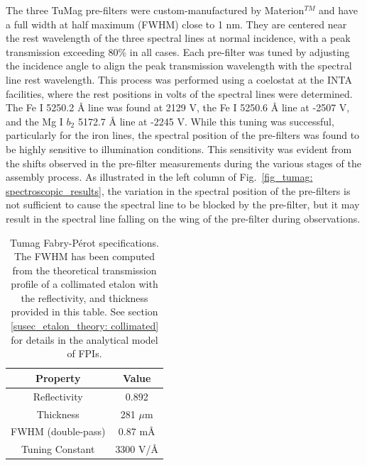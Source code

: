 The three TuMag pre-filters were custom-manufactured by Materion$^{TM}$ and have a full width at half maximum (FWHM) close to 1 nm. They are centered near the rest wavelength of the three spectral lines at normal incidence, with a peak transmission exceeding 80\% in all cases. Each pre-filter was tuned by adjusting the incidence angle to align the peak transmission wavelength with the spectral line rest wavelength. This process was performed using a coelostat at the INTA facilities, where the rest positions in volts of the spectral lines were determined. The Fe I 5250.2 \r{A} line was found at 2129 V, the Fe I 5250.6 \r{A} line at -2507 V, and the Mg I $b_2$ 5172.7 \r{A} line at -2245 V. While this tuning was successful, particularly for the iron lines, the spectral position of the pre-filters was found to be highly sensitive to illumination conditions. This sensitivity was evident from the shifts observed in the pre-filter measurements during the various stages of the assembly process. As illustrated in the left column of Fig.~\ref{fig_tumag: spectroscopic_results}, the variation in the spectral position of the pre-filters is not sufficient to cause the spectral line to be blocked by the pre-filter, but it may result in the spectral line falling on the wing of the pre-filter during observations.

\begin{table}
    \centering
   \begin{tabular}{cc}
    \hline
    \hline
    Property & Value \\
    \hline
    Reflectivity & 0.892 \\
    Thickness & 281 $\mu$m\\
    FWHM (double-pass) & 0.87 m\r{A}\\
    Tuning Constant & 3300 V/\r{A}\\
    \hline
    \hline
    \end{tabular}
    \caption{Tumag Fabry-Pérot specifications. The FWHM has been computed from the theoretical transmission profile of a collimated etalon with the reflectivity, and thickness provided in this table. See section \ref{susec_etalon_theory: collimated} for details in the analytical model of FPIs.}
    \label{table: Tumags etalon}
\end{table}

